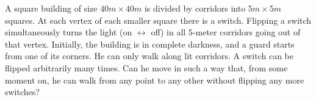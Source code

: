 \problem
A square building of size $40 m \times 40 m$ is divided by corridors into
$5 m \times 5 m$ squares.
At each vertex of each smaller square there is a switch.
Flipping a switch simultaneously turns the light (on $\leftrightarrow$ off) in
all $5$-meter corridors going out of that vertex.
Initially, the building is in complete darkness, and a guard starts from one of
its corners.
He can only walk along lit corridors.
A switch can be flipped arbitrarily many times.
Can he move in such a way that, from some moment on, he can walk from any point
to any other without flipping any more switches?
\solution
\endproblem
